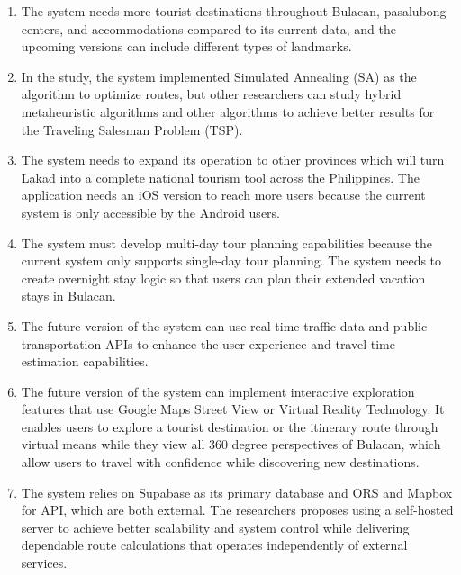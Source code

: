 \begin{enumerate}
	\item The system needs more tourist destinations throughout Bulacan, pasalubong centers, and accommodations compared to its current data, and the  upcoming versions can include different types of landmarks. 

	\item In the study, the system implemented Simulated Annealing (SA) as the algorithm to optimize routes, but other researchers can study hybrid metaheuristic algorithms and other algorithms to achieve better results for the Traveling Salesman Problem (TSP).

	\item The system needs to expand its operation to other provinces which will turn Lakad into a complete national tourism tool across the Philippines. The application needs an iOS version to reach more users because the current system is only accessible by the Android users.

	\item The system must develop multi-day tour planning capabilities because the current system only supports single-day tour planning. The system needs to create overnight stay logic so that users can plan their extended vacation stays in Bulacan.

	\item The future version of the system can use real-time traffic data and public transportation APIs to enhance the user experience and travel time estimation capabilities.

	\item The future version of the system can implement interactive exploration features that use Google Maps Street View or Virtual Reality Technology. It enables users to explore a tourist destination or the itinerary route through virtual means while they view all 360 degree perspectives of Bulacan, which allow users to travel with confidence while discovering new destinations.


	\item The system relies on Supabase as its primary database and ORS and Mapbox for API, which are both external. The researchers proposes using a self-hosted server to achieve better scalability and system control while delivering dependable route calculations that operates independently of external services.
\end{enumerate}
